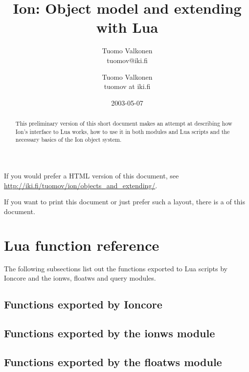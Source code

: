 \documentclass[english,a4paper,11pt,oldtoc]{artikel3}
\title{Ion: Object model and extending with Lua}
\author{Tuomo Valkonen \\ tuomov@iki.fi}
\author{Tuomo Valkonen \\ tuomov at iki.fi}
\date{2003-05-07}
\begin{document}
\maketitle

\begin{abstract}
This preliminary version of this short document makes
an attempt at
describing how Ion's interface to Lua works, how to use it in both
modules and Lua scripts and the necessary basics of the Ion object
system.
\end{abstract}

    If you would prefer a HTML version of this document, see
    \url{http://iki.fi/tuomov/ion/objects_and_extending/}.
\begin{htmlonly}
    If you want to print this document or just prefer such a layout,
    there is a
    of this document.
\end{htmlonly}

\tableofcontents







\section{Lua function reference}
\label{sec:exports}

The following subsections list out the functions exported to Lua scripts
by Ioncore and the ionws, floatws and query modules.

\subsection{Functions exported by Ioncore}
\label{sec:ioncoreref}



\subsection{Functions exported by the ionws module}
\label{sec:ionwsref}



\subsection{Functions exported by the floatws module}
\label{sec:floatwsref}
\end{document}
